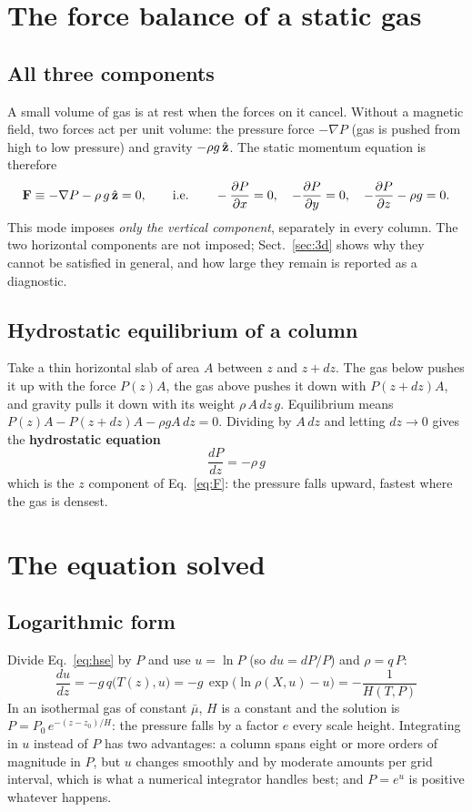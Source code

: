\section{The force balance of a static gas}\label{sec:force}
\subsection{All three components}
A small volume of gas is at rest when the forces on it cancel. Without a magnetic field, two forces act per unit volume:
the pressure force $-\nabla P$ (gas is pushed from high to low pressure) and gravity $-\rho g\,\hat{\mathbf z}$. The static momentum
equation is therefore
\begin{equation}
\mathbf F\equiv-\nabla P-\rho\,g\,\hat{\mathbf z}=0,\qquad\text{i.e.}\qquad
-\frac{\partial P}{\partial x}=0,\quad -\frac{\partial P}{\partial y}=0,\quad -\frac{\partial P}{\partial z}-\rho g=0 .
\label{eq:F}
\end{equation}
This mode imposes \emph{only the vertical component}, separately in every column. The two horizontal components are not
imposed; Sect.~\ref{sec:3d} shows why they cannot be satisfied in general, and how large they remain is reported as a
diagnostic.

\subsection{Hydrostatic equilibrium of a column}
Take a thin horizontal slab of area $A$ between $z$ and $z+dz$. The gas below pushes it up with the force $P(z)A$, the gas
above pushes it down with $P(z+dz)A$, and gravity pulls it down with its weight $\rho\,A\,dz\,g$. Equilibrium means
$P(z)A-P(z+dz)A-\rho gA\,dz=0$. Dividing by $A\,dz$ and letting $dz\to0$ gives the \textbf{hydrostatic equation}
\begin{equation}
\boxed{\;\frac{dP}{dz}=-\rho\,g\;}\label{eq:hse}
\end{equation}
which is the $z$ component of Eq.~\eqref{eq:F}: the pressure falls upward, fastest where the gas is densest.



\section{The equation solved}\label{sec:eq}
\subsection{Logarithmic form}
Divide Eq.~\eqref{eq:hse} by $P$ and use $u=\ln P$ (so $du=dP/P$) and $\rho=q\,P$:
\begin{equation}
\boxed{\;\frac{du}{dz}=-g\,q\big(T(z),u\big)=-g\,\exp\!\big(\ln\rho(X,u)-u\big)=-\frac{1}{H(T,P)}\;}\label{eq:dudz}
\end{equation}
In an isothermal gas of constant $\bar\mu$, $H$ is a constant and the solution is $P=P_0\,e^{-(z-z_0)/H}$: the pressure falls
by a factor $e$ every scale height. Integrating in $u$ instead of $P$ has two advantages: a column spans eight or more
orders of magnitude in $P$, but $u$ changes smoothly and by moderate amounts per grid interval, which is what a numerical
integrator handles best; and $P=e^u$ is positive whatever happens.

